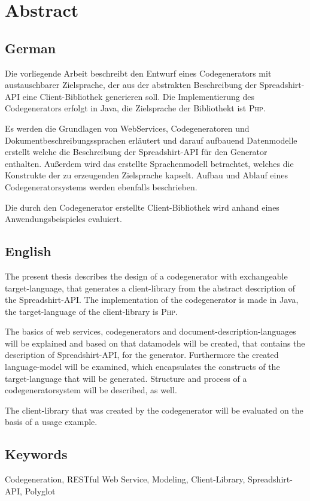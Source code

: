 \chapter*{Abstract}


\section*{German}

Die vorliegende Arbeit beschreibt den Entwurf eines Codegenerators mit austauschbarer Zielsprache, der aus der abstrakten Beschreibung der Spreadshirt-\gls{API} eine Client-Bibliothek generieren soll. Die Implementierung des Codegenerators erfolgt in Java, die Zielsprache der Bibliothekt ist \textsc{Php}. 

Es werden die Grundlagen von WebServices, Codegeneratoren und Dokumentbeschreibungssprachen erläutert und darauf aufbauend Datenmodelle erstellt welche die Beschreibung der Spreadshirt-\gls{API} für den Generator enthalten. Außerdem wird das erstellte Sprachenmodell betrachtet, welches die Konstrukte der zu erzeugenden Zielsprache kapselt. Aufbau und Ablauf eines Codegeneratorsystems werden ebenfalls beschrieben.

Die durch den Codegenerator erstellte Client-Bibliothek wird anhand eines Anwendungsbeispieles evaluiert.

\section*{English}

The present thesis describes the design of a codegenerator with exchangeable target-language, that generates a client-library from the abstract description of the Spreadshirt-\gls{API}. The implementation of the codegenerator is made in Java, the target-language of the client-library is \textsc{Php}.

The basics of web services, codegenerators and document-description-languages will be explained and based on that datamodels will be created, that contains the description of Spreadshirt-\gls{API}, for the generator. Furthermore the created language-model will be examined, which encapsulates the constructs of the target-language that will be generated. Structure and process of a codegeneratorsystem will be described, as well.

The client-library that was created by the codegenerator will be evaluated on the basis of a usage example.

\section*{Keywords}

Codegeneration, \gls{RESTful} Web Service, Modeling, Client-Library, Spreadshirt-\gls{API}, Polyglot
\newpage